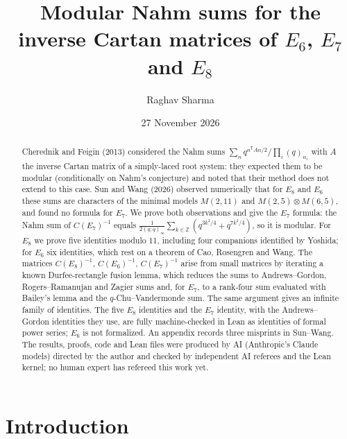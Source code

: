\documentclass[11pt]{amsart}
\title[Nahm sums for $E_6$, $E_7$, $E_8$]{Modular Nahm sums for the inverse Cartan matrices of
$E_6$, $E_7$ and $E_8$}
\author{Raghav Sharma}
\date{27 November 2026}
\theoremstyle{definition}
\numberwithin{equation}{section}
\newcommand{\Z}{\mathbb{Z}}
\newcommand{\T}{\mathsf T}
\begin{document}
\begin{abstract}
Cherednik and Feigin (2013) considered the Nahm sums
$\sum_{n}q^{n^{\T}An/2}/\prod_i(q)_{n_i}$ with $A$ the inverse Cartan matrix of a
simply-laced root system: they expected them to be modular (conditionally on Nahm's conjecture) and
noted that their method does not extend to this case. Sun and Wang (2026) observed
numerically that for $E_8$ and $E_6$ these sums are characters of the minimal models $M(2,11)$ and
$M(2,5)\otimes M(6,5)$, and found no formula for $E_7$. We prove both observations and give the $E_7$
formula: the Nahm sum of $C(E_7)^{-1}$ equals $\frac1{2(q;q)_\infty}\sum_{k\in\Z}(q^{3k^2/4}+q^{7k^2/4})$,
so it is modular. For $E_8$ we prove five identities modulo 11, including four companions identified by
Yoshida; for $E_6$ six identities, which rest on a theorem of Cao, Rosengren and Wang. The matrices
$C(E_8)^{-1}$, $C(E_6)^{-1}$, $C(E_7)^{-1}$ arise from small matrices by iterating a known Durfee-rectangle
fusion lemma, which reduces the sums to Andrews--Gordon, Rogers--Ramanujan and Zagier sums and, for
$E_7$, to a rank-four sum evaluated with Bailey's lemma and the $q$-Chu--Vandermonde sum. The same
argument gives an infinite family of identities. The five $E_8$ identities and the $E_7$ identity, with the
Andrews--Gordon identities they use, are fully machine-checked in Lean as identities of formal power series;
$E_6$ is not formalized. An appendix records three misprints in Sun--Wang. The results, proofs, code and Lean files were
produced by AI (Anthropic's Claude models) directed by the author and checked by independent AI referees
and the Lean kernel; no human expert has refereed this work yet.
\end{abstract}

\maketitle

\section{Introduction}\label{sec:intro}
\end{document}

